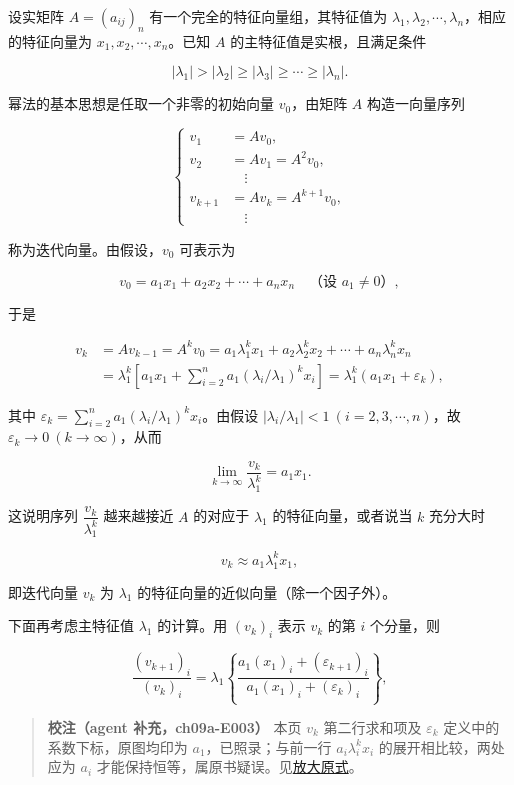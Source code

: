 \documentclass[
  10pt,
  fontset=fandol]{ctexart}
\begin{document}
设实矩阵 \(A=(a_{ij})_n\) 有一个完全的特征向量组，其特征值为 \(\lambda_1,\lambda_2,\cdots,\lambda_n\)，相应的特征向量为 \(x_1,x_2,\cdots,x_n\)。已知 \(A\) 的主特征值是实根，且满足条件

\[
|\lambda_1|>|\lambda_2|\geq|\lambda_3|\geq\cdots\geq|\lambda_n|.
\tag{9.2.1}
\]

幂法的基本思想是任取一个非零的初始向量 \(v_0\)，由矩阵 \(A\) 构造一向量序列

\[
\left\{
\begin{aligned}
v_1&=Av_0,\\
v_2&=Av_1=A^2v_0,\\
&\quad\vdots\\
v_{k+1}&=Av_k=A^{k+1}v_0,\\
&\quad\vdots
\end{aligned}
\right.
\tag{9.2.2}
\]

称为迭代向量。由假设，\(v_0\) 可表示为

\[
v_0=a_1x_1+a_2x_2+\cdots+a_nx_n\quad\text{（设 }a_1\ne0\text{）},
\tag{9.2.3}
\]

于是

\[
\begin{aligned}
v_k&=Av_{k-1}=A^kv_0=a_1\lambda_1^kx_1+a_2\lambda_2^kx_2+\cdots+a_n\lambda_n^kx_n\\
&=\lambda_1^k\left[a_1x_1+\sum_{i=2}^na_1(\lambda_i/\lambda_1)^kx_i\right]=\lambda_1^k(a_1x_1+\varepsilon_k),
\end{aligned}
\]

其中 \(\varepsilon_k=\displaystyle\sum_{i=2}^na_1(\lambda_i/\lambda_1)^kx_i\)。由假设 \(|\lambda_i/\lambda_1|<1\ (i=2,3,\cdots,n)\)，故 \(\varepsilon_k\to0\ (k\to\infty)\)，从而

\[
\lim_{k\to\infty}\frac{v_k}{\lambda_1^k}=a_1x_1.
\tag{9.2.4}
\]

这说明序列 \(\dfrac{v_k}{\lambda_1^k}\) 越来越接近 \(A\) 的对应于 \(\lambda_1\) 的特征向量，或者说当 \(k\) 充分大时

\[
v_k\approx a_1\lambda_1^kx_1,
\tag{9.2.5}
\]

即迭代向量 \(v_k\) 为 \(\lambda_1\) 的特征向量的近似向量（除一个因子外）。

下面再考虑主特征值 \(\lambda_1\) 的计算。用 \((v_k)_i\) 表示 \(v_k\) 的第 \(i\) 个分量，则

\[
\frac{(v_{k+1})_i}{(v_k)_i}=\lambda_1\left\{\frac{a_1(x_1)_i+(\varepsilon_{k+1})_i}{a_1(x_1)_i+(\varepsilon_k)_i}\right\},
\tag{9.2.6}
\]

\begin{quote}
\textbf{校注（agent 补充，ch09a-E003）} 本页 \(v_k\) 第二行求和项及 \(\varepsilon_k\) 定义中的系数下标，原图均印为 \(a_1\)，已照录；与前一行 \(a_i\lambda_i^kx_i\) 的展开相比较，两处应为 \(a_i\) 才能保持恒等，属原书疑误。见\href{../assets/ch09a/review-p235-power-expansion.png}{放大原式}。
\end{quote}
\end{document}
